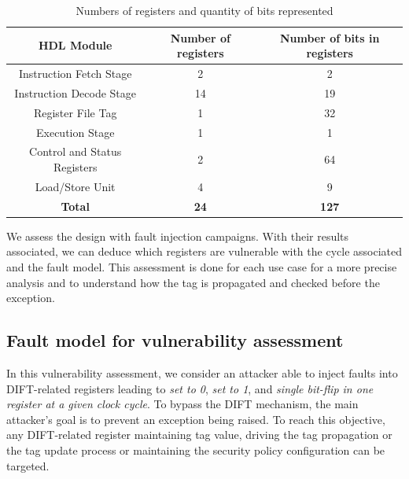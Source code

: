 \begin{table}[t]
    \centering
    \caption{Numbers of registers and quantity of bits represented}
    \label{tab:registersDIFT}
    \begin{tabular}{@{}ccc@{}}
        \toprule
        \textbf{HDL Module} & \textbf{Number of registers} & \textbf{Number of bits in registers} \\ \midrule
        Instruction Fetch Stage & 2 & 2 \\
        Instruction Decode Stage & 14 & 19 \\
        Register File Tag & 1 & 32 \\
        Execution Stage & 1 & 1 \\
        Control and Status Registers & 2 & 64 \\
        Load/Store Unit & 4 & 9 \\
        \midrule
        \midrule
        \textbf{Total} & \textbf{\textbf{24}} & \textbf{\textbf{127}} \\
        \bottomrule
    \end{tabular}
\end{table}

We assess the design with fault injection campaigns. With their results associated, we can deduce which registers are vulnerable with the cycle associated and the fault model. This assessment is done for each use case for a more precise analysis and to understand how the tag is propagated and checked before the exception.

\subsection{Fault model for vulnerability assessment}
In this vulnerability assessment, we consider an attacker able to inject faults into DIFT-related registers leading to \textit{set to 0}, \textit{set to 1}, and \textit{single bit-flip in one register at a given clock cycle}. To bypass the DIFT mechanism, the main attacker's goal is to prevent an exception being raised. To reach this objective, any DIFT-related register maintaining tag value, driving the tag propagation or the tag update process or maintaining the security policy configuration can be targeted.


